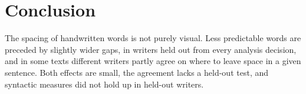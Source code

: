 \documentclass[11pt]{article}
\begin{document}
\section{Conclusion}
The spacing of handwritten words is not purely visual. Less predictable words are preceded by slightly wider gaps, in writers held out from every analysis decision, and in some texts different writers partly agree on where to leave space in a given sentence. Both effects are small, the agreement lacks a held-out test, and syntactic measures did not hold up in held-out writers.


\end{document}
